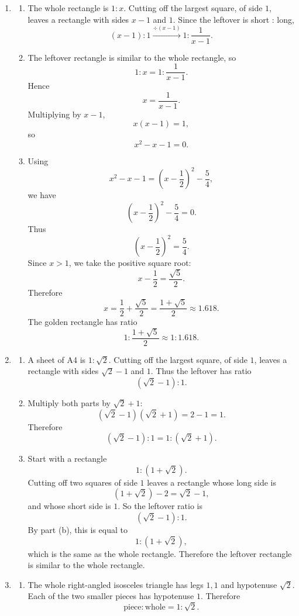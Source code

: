 \documentclass[11pt,a4paper]{article}
\begin{document}
\begin{enumerate}[label=\textbf{Q\arabic*.}, leftmargin=*, itemsep=1.2em]
\item
\begin{enumerate}[label=(\alph*)]
\item The whole rectangle is \(1:x\). Cutting off the largest square, of side \(1\), leaves a rectangle with sides \(x-1\) and \(1\). Since the leftover is short : long,
\[
(x-1):1\xrightarrow{\div (x-1)}1:\frac1{x-1}.
\]

\item The leftover rectangle is similar to the whole rectangle, so
\[
1:x=1:\frac1{x-1}.
\]
Hence
\[
x=\frac1{x-1}.
\]
Multiplying by \(x-1\),
\[
x(x-1)=1,
\]
so
\[
x^2-x-1=0.
\]

\item Using
\[
x^2-x-1=\left(x-\frac12\right)^2-\frac54,
\]
we have
\[
\left(x-\frac12\right)^2-\frac54=0.
\]
Thus
\[
\left(x-\frac12\right)^2=\frac54.
\]
Since \(x>1\), we take the positive square root:
\[
x-\frac12=\frac{\sqrt5}{2}.
\]
Therefore
\[
x=\frac12+\frac{\sqrt5}{2}=\frac{1+\sqrt5}{2}\approx 1.618.
\]
The golden rectangle has ratio
\[
1:\frac{1+\sqrt5}{2}\approx 1:1.618.
\]
\end{enumerate}

\item
\begin{enumerate}[label=(\alph*)]
\item A sheet of A4 is \(1:\sqrt2\). Cutting off the largest square, of side \(1\), leaves a rectangle with sides \(\sqrt2-1\) and \(1\). Thus the leftover has ratio
\[
(\sqrt2-1):1.
\]

\item Multiply both parts by \(\sqrt2+1\):
\[
(\sqrt2-1)(\sqrt2+1)=2-1=1.
\]
Therefore
\[
(\sqrt2-1):1
=
1:(\sqrt2+1).
\]

\item Start with a rectangle
\[
1:(1+\sqrt2).
\]
Cutting off two squares of side \(1\) leaves a rectangle whose long side is
\[
(1+\sqrt2)-2=\sqrt2-1,
\]
and whose short side is \(1\). So the leftover ratio is
\[
(\sqrt2-1):1.
\]
By part (b), this is equal to
\[
1:(1+\sqrt2),
\]
which is the same as the whole rectangle. Therefore the leftover rectangle is similar to the whole rectangle.
\end{enumerate}

\item
\begin{enumerate}[label=(\alph*)]
\item The whole right-angled isosceles triangle has legs \(1,1\) and hypotenuse \(\sqrt2\). Each of the two smaller pieces has hypotenuse \(1\). Therefore
\[
\text{piece}:\text{whole}=1:\sqrt2.
\]


\end{enumerate}
\end{enumerate}
\end{document}
